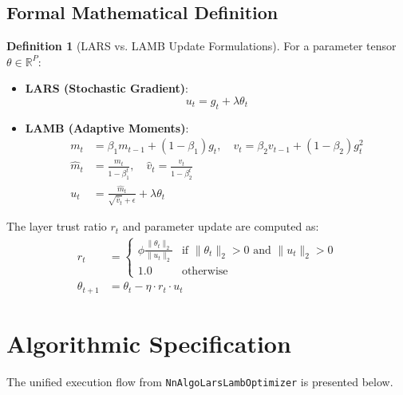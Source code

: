 \documentclass[11pt,a4paper]{article}
\theoremstyle{definition}
\newtheorem{definition}{Definition}[section]
\begin{document}
\subsection{Formal Mathematical Definition}
\begin{definition}[LARS vs. LAMB Update Formulations]
For a parameter tensor $\theta \in \mathbb{R}^P$:
\begin{itemize}
    \item \textbf{LARS (Stochastic Gradient)}:
    \begin{equation}
    u_t = g_t + \lambda \theta_t
    \end{equation}
    \item \textbf{LAMB (Adaptive Moments)}:
    \begin{align}
    m_t &= \beta_1 m_{t-1} + (1 - \beta_1) g_t, \quad v_t = \beta_2 v_{t-1} + (1 - \beta_2) g_t^2 \\
    \hat{m}_t &= \frac{m_t}{1 - \beta_1^t}, \quad \hat{v}_t = \frac{v_t}{1 - \beta_2^t} \\
    u_t &= \frac{\hat{m}_t}{\sqrt{\hat{v}_t} + \epsilon} + \lambda \theta_t
    \end{align}
\end{itemize}
The layer trust ratio $r_t$ and parameter update are computed as:
\begin{align}
r_t &= \begin{cases} \phi \frac{\|\theta_t\|_2}{\|u_t\|_2} & \text{if } \|\theta_t\|_2 > 0 \text{ and } \|u_t\|_2 > 0 \\ 1.0 & \text{otherwise} \end{cases} \label{eq:trust_ratio} \\
\theta_{t+1} &= \theta_t - \eta \cdot r_t \cdot u_t \label{eq:lars_lamb_update}
\end{align}
\end{definition}

\section{Algorithmic Specification}

The unified execution flow from \texttt{NnAlgoLarsLambOptimizer} is presented below.
\end{document}
